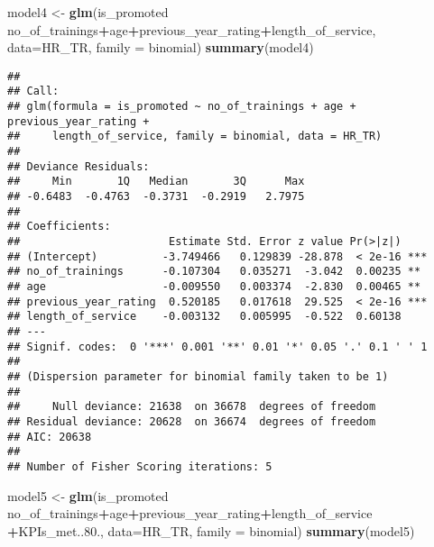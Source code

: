 \documentclass[
]{article}
\newenvironment{Shaded}{\begin{snugshade}}{\end{snugshade}}
\newcommand{\DataTypeTok}[1]{\textcolor[rgb]{0.13,0.29,0.53}{#1}}
\newcommand{\FloatTok}[1]{\textcolor[rgb]{0.00,0.00,0.81}{#1}}
\newcommand{\KeywordTok}[1]{\textcolor[rgb]{0.13,0.29,0.53}{\textbf{#1}}}
\newcommand{\NormalTok}[1]{#1}
\newcommand{\OperatorTok}[1]{\textcolor[rgb]{0.81,0.36,0.00}{\textbf{#1}}}
\newcommand{\StringTok}[1]{\textcolor[rgb]{0.31,0.60,0.02}{#1}}
\begin{document}
\begin{Shaded}
\begin{Highlighting}[]
\NormalTok{model4 <-}\StringTok{ }\KeywordTok{glm}\NormalTok{(is_promoted }\OperatorTok{~}\StringTok{ }\NormalTok{no_of_trainings}\OperatorTok{+}\NormalTok{age}\OperatorTok{+}\NormalTok{previous_year_rating}\OperatorTok{+}\NormalTok{length_of_service, }
              \DataTypeTok{data=}\NormalTok{HR_TR, }\DataTypeTok{family =}\NormalTok{ binomial)}
\KeywordTok{summary}\NormalTok{(model4)}
\end{Highlighting}
\end{Shaded}

\begin{verbatim}
## 
## Call:
## glm(formula = is_promoted ~ no_of_trainings + age + previous_year_rating + 
##     length_of_service, family = binomial, data = HR_TR)
## 
## Deviance Residuals: 
##     Min       1Q   Median       3Q      Max  
## -0.6483  -0.4763  -0.3731  -0.2919   2.7975  
## 
## Coefficients:
##                       Estimate Std. Error z value Pr(>|z|)    
## (Intercept)          -3.749466   0.129839 -28.878  < 2e-16 ***
## no_of_trainings      -0.107304   0.035271  -3.042  0.00235 ** 
## age                  -0.009550   0.003374  -2.830  0.00465 ** 
## previous_year_rating  0.520185   0.017618  29.525  < 2e-16 ***
## length_of_service    -0.003132   0.005995  -0.522  0.60138    
## ---
## Signif. codes:  0 '***' 0.001 '**' 0.01 '*' 0.05 '.' 0.1 ' ' 1
## 
## (Dispersion parameter for binomial family taken to be 1)
## 
##     Null deviance: 21638  on 36678  degrees of freedom
## Residual deviance: 20628  on 36674  degrees of freedom
## AIC: 20638
## 
## Number of Fisher Scoring iterations: 5
\end{verbatim}

\begin{Shaded}
\begin{Highlighting}[]
\NormalTok{model5 <-}\StringTok{ }\KeywordTok{glm}\NormalTok{(is_promoted }\OperatorTok{~}\StringTok{ }\NormalTok{no_of_trainings}\OperatorTok{+}\NormalTok{age}\OperatorTok{+}\NormalTok{previous_year_rating}\OperatorTok{+}\NormalTok{length_of_service}
              \OperatorTok{+}\NormalTok{KPIs_met..}\FloatTok{80.}\NormalTok{, }
              \DataTypeTok{data=}\NormalTok{HR_TR, }\DataTypeTok{family =}\NormalTok{ binomial)}
\KeywordTok{summary}\NormalTok{(model5)}
\end{Highlighting}
\end{Shaded}
\end{document}
